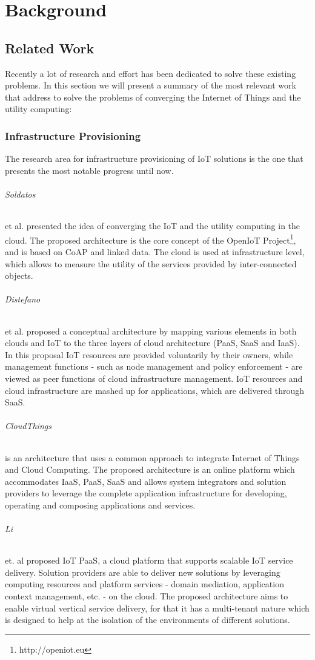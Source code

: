 
\chapter{Background}
\label{chapter:background}

\section{Related Work}
\label{section:related_work}
Recently a lot of research and effort has been dedicated to solve these existing problems. In this
section we will present a summary of the most relevant work that address to solve the problems of
converging the Internet of Things and the utility computing:

\subsection{Infrastructure Provisioning}
\label{sub:provisioning}
The research area for infrastructure provisioning of IoT solutions is the one that presents the most
notable progress until now.

\subparagraph{Soldatos} et al. \cite{soldatos2012convergence} presented the idea of converging the IoT
and the utility computing in the cloud. The proposed architecture is the core concept of the OpenIoT
Project\footnote{http://openiot.eu}, and is based on CoAP \cite{shelby2014constrained} and linked data.
The cloud is used at infrastructure level, which allows to measure the utility of the services provided
by inter-connected objects.
\subparagraph{Distefano} et al. \cite{distefano2012enabling} proposed a conceptual architecture by mapping various
elements in both clouds and IoT to the three layers of cloud architecture (\gls{PaaS}, \gls{SaaS} and \gls{IaaS}).
In this proposal IoT resources are provided voluntarily by their owners, while management functions
- such as node management and policy enforcement - are viewed as peer functions of cloud infrastructure
management. IoT resources and cloud infrastructure are mashed up for applications, which are delivered
through \gls{SaaS}.
\subparagraph{CloudThings} \cite{zhou2013cloudthings} is an architecture that uses a common
approach to integrate Internet of Things and Cloud Computing. The proposed architecture is an online
platform which accommodates \gls{IaaS}, \gls{PaaS}, \gls{SaaS} and allows system integrators and
solution providers to leverage the complete application infrastructure for developing, operating
and composing applications and services.
\subparagraph{Li} et. al \cite{li2013efficient} proposed IoT PaaS, a cloud platform that supports
scalable IoT service delivery. Solution providers are able to deliver new solutions by leveraging
computing resources and platform services - domain mediation, application context management, etc.
- on the cloud. The proposed architecture aims to enable virtual vertical service delivery, for that
it has a multi-tenant nature which is designed to help at the isolation of the environments of
different solutions.

